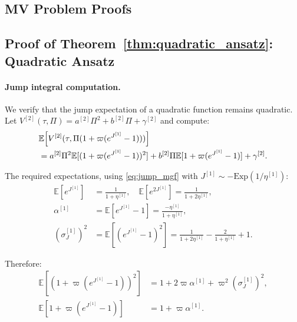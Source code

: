 \documentclass[11pt,a4paper]{article}
\numberwithin{equation}{section}
\newcommand{\E}{\mathbb{E}}
\begin{document}
\begin{appendices}

\section{MV Problem Proofs}\label{app:mv_proofs}

\subsection{Proof of Theorem~\ref{thm:quadratic_ansatz}: Quadratic Ansatz}\label{app:quadratic}

\paragraph{Jump integral computation.}\label{app:jump_integral}

We verify that the jump expectation of a quadratic function remains quadratic. Let $V^{[2]}(\tau, \Pi) = a^{[2]}\Pi^2 + b^{[2]}\Pi + \gamma^{[2]}$ and compute:
\begin{align}
& \E\!\left[V^{[2]}(\tau, \Pi(1+\varpi(e^{J^{[1]}}-1)))\right] \notag \\
&= a^{[2]} \Pi^2 \E[(1+\varpi(e^{J^{[1]}}-1))^2] + b^{[2]} \Pi \E[1+\varpi(e^{J^{[1]}}-1)] + \gamma^{[2]}.
\label{eq:jump_quad_detail}
\end{align}

The required expectations, using \eqref{eq:jump_mgf} with $J^{[1]} \sim -\mathrm{Exp}(1/\eta^{[1]})$:
\begin{align}
\E[e^{J^{[1]}}] &= \frac{1}{1 + \eta^{[1]}}, \quad
\E[e^{2J^{[1]}}] = \frac{1}{1 + 2\eta^{[1]}}, \label{eq:jump_exp_moments} \\
\alpha^{[1]} &= \E[e^{J^{[1]}}-1] = \frac{-\eta^{[1]}}{1+\eta^{[1]}}, \label{eq:alpha1_detail} \\
(\sigma_J^{[1]})^2 &= \E[(e^{J^{[1]}}-1)^2] = \frac{1}{1+2\eta^{[1]}} - \frac{2}{1+\eta^{[1]}} + 1. \label{eq:sigJ1_detail}
\end{align}

Therefore:
\begin{align}
\E[(1+\varpi(e^{J^{[1]}}-1))^2] &= 1 + 2\varpi\alpha^{[1]} + \varpi^2 (\sigma_J^{[1]})^2, \label{eq:E_square} \\
\E[1+\varpi(e^{J^{[1]}}-1)] &= 1 + \varpi\alpha^{[1]}. \label{eq:E_linear}
\end{align}


\end{appendices}
\end{document}
